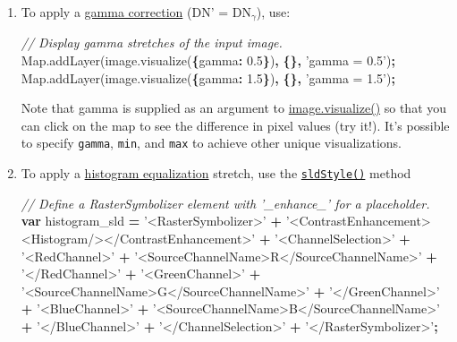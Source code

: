 \documentclass[
]{article}
\newenvironment{Shaded}{\begin{snugshade}}{\end{snugshade}}
\newcommand{\AttributeTok}[1]{\textcolor[rgb]{0.77,0.63,0.00}{#1}}
\newcommand{\CommentTok}[1]{\textcolor[rgb]{0.56,0.35,0.01}{\textit{#1}}}
\newcommand{\DataTypeTok}[1]{\textcolor[rgb]{0.13,0.29,0.53}{#1}}
\newcommand{\FloatTok}[1]{\textcolor[rgb]{0.00,0.00,0.81}{#1}}
\newcommand{\KeywordTok}[1]{\textcolor[rgb]{0.13,0.29,0.53}{\textbf{#1}}}
\newcommand{\NormalTok}[1]{#1}
\newcommand{\OperatorTok}[1]{\textcolor[rgb]{0.81,0.36,0.00}{\textbf{#1}}}
\newcommand{\StringTok}[1]{\textcolor[rgb]{0.31,0.60,0.02}{#1}}
\newcommand{\VariableTok}[1]{\textcolor[rgb]{0.00,0.00,0.00}{#1}}
\begin{document}
\begin{enumerate}
\def\labelenumi{\arabic{enumi}.}
\item
  To apply a \href{https://en.wikipedia.org/wiki/Gamma_correction}{gamma correction} (DN' = DN\(_\gamma\)), use:

\begin{Shaded}
\begin{Highlighting}[]
\CommentTok{// Display gamma stretches of the input image.}
\VariableTok{Map}\NormalTok{.}\AttributeTok{addLayer}\NormalTok{(}\VariableTok{image}\NormalTok{.}\AttributeTok{visualize}\NormalTok{(}\OperatorTok{\{}\DataTypeTok{gamma}\OperatorTok{:} \FloatTok{0.5}\OperatorTok{\}}\NormalTok{)}\OperatorTok{,} \OperatorTok{\{\},} \StringTok{'gamma = 0.5'}\NormalTok{)}\OperatorTok{;}
\VariableTok{Map}\NormalTok{.}\AttributeTok{addLayer}\NormalTok{(}\VariableTok{image}\NormalTok{.}\AttributeTok{visualize}\NormalTok{(}\OperatorTok{\{}\DataTypeTok{gamma}\OperatorTok{:} \FloatTok{1.5}\OperatorTok{\}}\NormalTok{)}\OperatorTok{,} \OperatorTok{\{\},} \StringTok{'gamma = 1.5'}\NormalTok{)}\OperatorTok{;}
\end{Highlighting}
\end{Shaded}

  Note that gamma is supplied as an argument to \href{https://developers.google.com/earth-engine/apidocs/ee-image-visualize}{image.visualize()} so that you can click on the map to see the difference in pixel values (try it!). It's possible to specify \texttt{gamma}, \texttt{min}, and \texttt{max} to achieve other unique visualizations.
\item
  To apply a \href{https://en.wikipedia.org/wiki/Histogram_equalization}{histogram equalization} stretch, use the \href{https://devsite.googleplex.com/earth-engine/image_visualization\#styled-layer-descriptors}{\texttt{sldStyle()}} method

\begin{Shaded}
\begin{Highlighting}[]
\CommentTok{// Define a RasterSymbolizer element with '_enhance_' for a placeholder.}
  \KeywordTok{var}\NormalTok{ histogram_sld }\OperatorTok{=}
    \StringTok{'<RasterSymbolizer>'} \OperatorTok{+}
      \StringTok{'<ContrastEnhancement><Histogram/></ContrastEnhancement>'} \OperatorTok{+}
      \StringTok{'<ChannelSelection>'} \OperatorTok{+}
        \StringTok{'<RedChannel>'} \OperatorTok{+}
          \StringTok{'<SourceChannelName>R</SourceChannelName>'} \OperatorTok{+}
        \StringTok{'</RedChannel>'} \OperatorTok{+}
        \StringTok{'<GreenChannel>'} \OperatorTok{+}
          \StringTok{'<SourceChannelName>G</SourceChannelName>'} \OperatorTok{+}
        \StringTok{'</GreenChannel>'} \OperatorTok{+}
        \StringTok{'<BlueChannel>'} \OperatorTok{+}
          \StringTok{'<SourceChannelName>B</SourceChannelName>'} \OperatorTok{+}
        \StringTok{'</BlueChannel>'} \OperatorTok{+}
      \StringTok{'</ChannelSelection>'} \OperatorTok{+}
    \StringTok{'</RasterSymbolizer>'}\OperatorTok{;}


\end{Highlighting}
\end{Shaded}
\end{enumerate}
\end{document}

